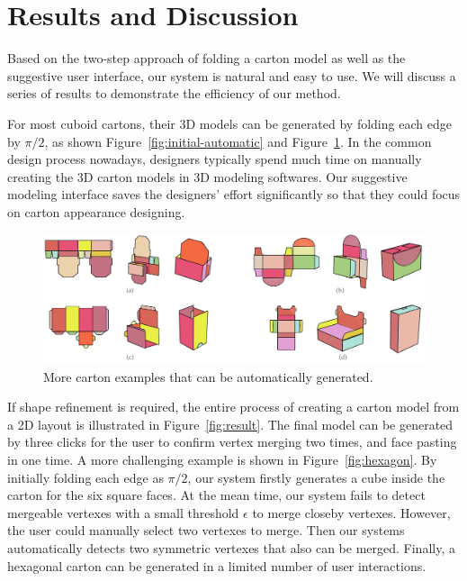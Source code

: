 \section{Results and Discussion}\label{sec:result}



Based on the two-step approach of folding a carton model as well as the suggestive user interface, our system is natural and easy to use. 
%
We will discuss a series of results to demonstrate the efficiency of our method. 


For most cuboid cartons, their 3D models can be generated by folding each edge by $\pi/2$, as shown Figure~\ref{fig:initial-automatic} and Figure~\ref{fig:automatic-more}.
In the common design process nowadays, designers typically spend much time on manually creating the 3D carton models in 3D modeling softwares. 
Our suggestive modeling interface saves the designers' effort significantly so that they could focus on carton appearance designing. 


\begin{figure}
	\centering
	\includegraphics[width=\textwidth]{images/automore}
	\caption{More carton examples that can be automatically generated.}
	\label{fig:automatic-more}
	
\end{figure}


If shape refinement is required, the entire process of creating a carton model from a 2D layout is illustrated in Figure~\ref{fig:result}.
The final model can be generated by three clicks for the user to confirm vertex merging two times, and face pasting in one time. 
%
A more challenging example is shown in Figure~\ref{fig:hexagon}. 
By initially folding each edge as $\pi/2$, our system firstly generates a cube inside the carton for the six square faces. 
At the mean time, our system fails to detect mergeable vertexes with a small threshold $\epsilon$ to merge closeby vertexes.
%
However, the user could manually select two vertexes to merge. Then our systems automatically detects two symmetric vertexes that also can be merged. 
%
Finally, a hexagonal carton can be generated in a limited number of user interactions.




